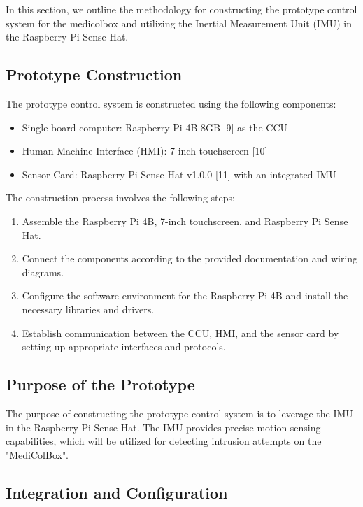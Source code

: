 
    In this section, we outline the methodology for constructing the prototype control system for the \gls{medicolbox} and utilizing the Inertial Measurement Unit (IMU) in the Raspberry Pi Sense Hat.

    \subsection{Prototype Construction}

    The prototype control system is constructed using the following components:

    \begin{itemize}
        \item Single-board computer: Raspberry Pi 4B 8GB [9] as the CCU
        \item Human-Machine Interface (HMI): 7-inch touchscreen [10]
        \item Sensor Card: Raspberry Pi Sense Hat v1.0.0 [11] with an integrated IMU
    \end{itemize}

    The construction process involves the following steps:

    \begin{enumerate}
        \item Assemble the Raspberry Pi 4B, 7-inch touchscreen, and Raspberry Pi Sense Hat.
        \item Connect the components according to the provided documentation and wiring diagrams.
        \item Configure the software environment for the Raspberry Pi 4B and install the necessary libraries and drivers.
        \item Establish communication between the CCU, HMI, and the sensor card by setting up appropriate interfaces and protocols.
    \end{enumerate}

    \subsection{Purpose of the Prototype}

    The purpose of constructing the prototype control system is to leverage the IMU in the Raspberry Pi Sense Hat. The IMU provides precise motion sensing capabilities, which will be utilized for detecting intrusion attempts on the "MediColBox".

    \subsection{Integration and Configuration}

